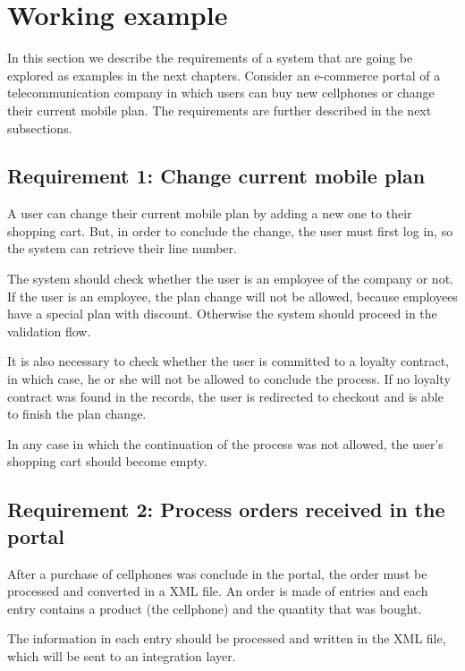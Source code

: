 \section{Working example}
\label{sec:workingExample}

In this section we describe the requirements of a system that are going be explored as examples in the next chapters. Consider an e-commerce portal of a telecommunication company in which users can buy new cellphones or change their current mobile plan. The requirements are further described in the next subsections.

\subsection{Requirement 1: Change current mobile plan}
\label{req1}

A user can change their current mobile plan by adding a new one to their shopping cart. But, in order to conclude the change, the user must first log in, so the system can retrieve their line number.

The system should check whether the user is an employee of the company or not. If the user is an employee, the plan change will not be allowed, because employees have a special plan with discount. Otherwise the system should proceed in the validation flow. 

It is also necessary to check whether the user is committed to a loyalty contract, in which case, he or she will not be allowed to conclude the process. If no loyalty contract was found in the records, the user is redirected to checkout and is able to finish the plan change. 

In any case in which the continuation of the process was not allowed, the user's shopping cart should become empty.

\subsection{Requirement 2: Process orders received in the portal}
\label{req2}

After a purchase of cellphones was conclude in the portal, the order must be processed and converted in a XML file. An order is made of entries and each entry contains a product (the cellphone) and the quantity that was bought.

The information in each entry should be processed and written in the XML file, which will be sent to an integration layer.

